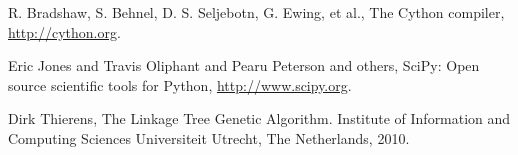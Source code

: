 \documentclass[12pt]{article}
\theoremstyle{definition}
\begin{document}
\begin{thebibliography}{9}

R. Bradshaw, S. Behnel, D. S. Seljebotn, G. Ewing, et al.,
The Cython compiler, \url{http://cython.org}.

Eric Jones and Travis Oliphant and Pearu Peterson and others,
SciPy: Open source scientific tools for Python, \url{http://www.scipy.org}.

Dirk Thierens,
The Linkage Tree Genetic Algorithm.
Institute of Information and Computing Sciences
Universiteit Utrecht, The Netherlands,
2010.

\end{thebibliography}
\end{document}
